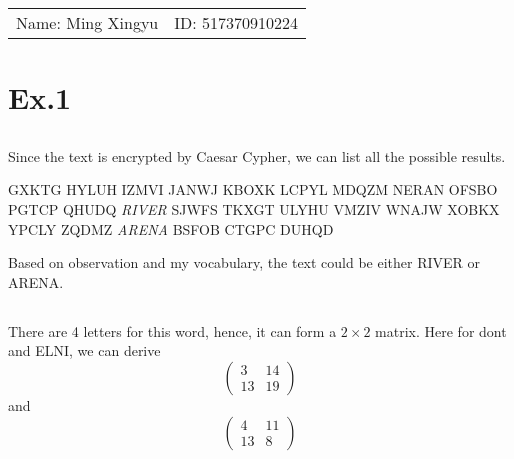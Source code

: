 \documentclass[12pt,a4paper]{article}
\theoremstyle{definition}
\begin{document}
\vspace*{0.25cm}

\hrulefill

\thispagestyle{empty}

\begin{center}
\begin{large}
\end{large}

\hrulefill

\vspace*{5cm}
\begin{Large}
\end{Large}
\end{center}


\vfill

\begin{table}[h!]
\flushleft
\begin{tabular}{ll}
Name: Ming Xingyu \hspace*{2em}&
ID: 517370910224\hspace*{2em}\\
\end{tabular}
\end{table}

\hfill
\newpage
\section{Ex.1}
\subsection{}


Since the text is encrypted by Caesar Cypher, we can list all the possible results. 

\noindent
GXKTG
HYLUH
IZMVI
JANWJ
KBOXK
LCPYL
MDQZM
NERAN
OFSBO
PGTCP
QHUDQ
\textit{RIVER}
SJWFS
TKXGT
ULYHU
VMZIV
WNAJW
XOBKX
YPCLY
ZQDMZ
\textit{ARENA}
BSFOB
CTGPC
DUHQD

Based on observation and my vocabulary, the text could be either RIVER or ARENA. 
\subsection{}
There are 4 letters for this word, hence, it can form a $2\times 2$ matrix. Here for dont and ELNI, we can derive
$$
\left(
\begin{matrix}
3&14\\
13&19
\end{matrix}
\right)
$$
and
$$
\left(
\begin{matrix}
4&11\\
13&8
\end{matrix}
\right)
$$
\end{document}
